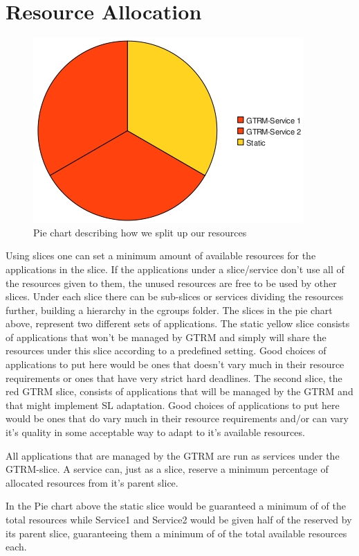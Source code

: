 \documentclass[nobiblatex]{LTHthesis}
\begin{document}
\section{Resource Allocation}
\begin{figure}
    \centering
    \includegraphics{piechart.jpeg}
    \caption{Pie chart describing how we split up our resources}
    \label{fig:Piechart}
\end{figure}

Using slices one can set a minimum amount of available resources for the applications in the slice. If the applications under a slice/service don’t use all of the resources given to them, the unused resources are free to be used by other slices. Under each slice there can be sub-slices or services dividing the resources further, building a hierarchy in the cgroups folder. The slices in the pie chart above, represent two different sets of applications. The static yellow slice consists of applications that won’t be managed by GTRM and simply will share the resources under this slice according to a predefined setting. Good choices of applications to put here would be ones that doesn’t vary much in their resource requirements or ones that have very strict hard deadlines. The second slice, the red GTRM slice, consists of applications that will be managed by the GTRM and that might implement SL adaptation. Good choices of applications to put here would be ones that do vary much in their resource requirements and/or can vary it’s quality in some acceptable way to adapt to it’s available resources.

All applications that are managed by the GTRM are run as services under the GTRM-slice. A service can, just as a slice, reserve a minimum percentage of allocated resources from it’s parent slice.

In the Pie chart above the static slice would be guaranteed a minimum of  of the total resources while Service1 and Service2 would be given half of the  reserved by its parent slice, guaranteeing  them a minimum of  of the total available resources each.
\end{document}
